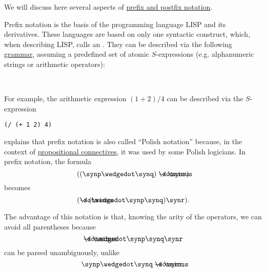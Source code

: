 \begin{remark}\label{rem:def:function_application_syntax}
  We will discuss here several aspects of \hyperref[def:function_application_syntax]{prefix and postfix notation}.

  \begin{thmenum}
     Prefix notation is the basis of the programming language LISP and its derivatives. These languages are based on only one syntactic construct, which, when describing LISP,  calls an . They can be described via the following \hyperref[def:formal_grammar]{grammar}, assuming a predefined set of atomic \( S \)-expressions (e.g. alphanumeric strings or arithmetic operators):
    \begin{bnf*}
       { \bnfor {} \bnfsp \bnftsq{ } \bnfsp {}} \\
            { \bnfor \bnftsq{(} \bnfsp {} \bnfsp \bnftsq{)}}
    \end{bnf*}

    For example, the arithmetic expression \( (1 + 2) / 4 \) can be described via the \( S \)-expression
    \begin{center}
      \begin{BVerbatim}[gobble=8]
        (/ (+ 1 2) 4)
      \end{BVerbatim}
    \end{center}

      explains that prefix notation is also called \enquote{Polish notation} because, in the context of \hyperref[def:propositional_alphabet/connectives]{propositional connectives}, it was used by some Polish logicians. In prefix notation, the formula
    \begin{equation*}
      ((\synp \synwedge \synq) \synimplies \synr)
    \end{equation*}
    becomes
    \begin{equation*}
      (\synimplies (\synwedge \synp \synq) \synr).
    \end{equation*}

    The advantage of this notation is that, knowing the arity of the operators, we can avoid all parentheses because
    \begin{equation*}
      \synimplies \synwedge \synp \synq \synr
    \end{equation*}
    can be parsed unambiguously, unlike
    \begin{equation*}
      \synp \synwedge \synq \synimplies \synr.
    \end{equation*}


\end{thmenum}
\end{remark}
